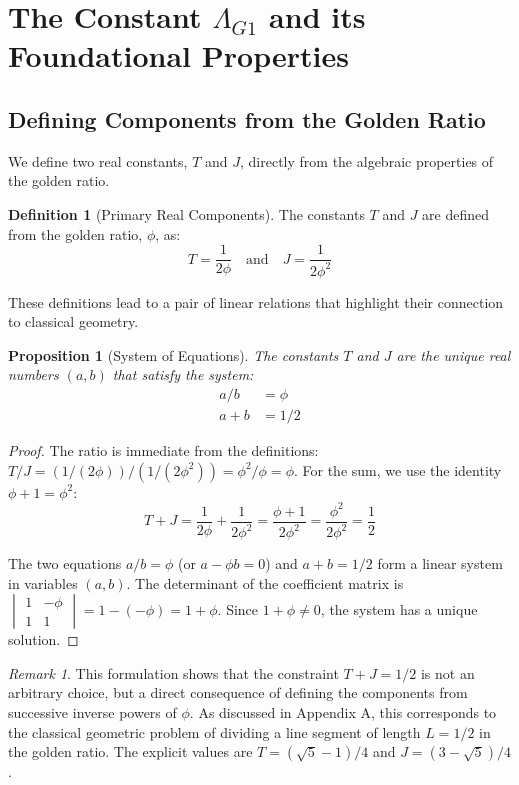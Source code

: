 \documentclass{amsart}
\theoremstyle{plain}
\newtheorem{proposition}[theorem]{Proposition}
\theoremstyle{definition}
\newtheorem{definition}[theorem]{Definition}
\theoremstyle{remark}
\newtheorem*{remark}{Remark}
\newcommand{\LambdaG}{\Lambda_{G1}}
\newcommand{\phiG}{\phi}
\begin{document}
\section{The Constant \texorpdfstring{$\LambdaG$}{Lambda\_G1} and its Foundational Properties}

\subsection{Defining Components from the Golden Ratio}
We define two real constants, $T$ and $J$, directly from the algebraic properties of the golden ratio.
\begin{definition}[Primary Real Components]
The constants $T$ and $J$ are defined from the golden ratio, $\phiG$, as:
$$ T = \frac{1}{2\phiG} \quad \text{and} \quad J = \frac{1}{2\phiG^2} $$

\end{definition}

These definitions lead to a pair of linear relations that highlight their connection to classical geometry.
\begin{proposition}[System of Equations]
The constants $T$ and $J$ are the unique real numbers $(a,b)$ that satisfy the system:
\begin{align}
    a/b &= \phiG \\
    a+b &= 1/2
\end{align}

\end{proposition}
\begin{proof}
The ratio is immediate from the definitions: $T/J = (1/(2\phiG))/(1/(2\phiG^2)) = \phiG^2/\phiG = \phiG$. For the sum, we use the identity $\phiG+1 = \phiG^2$:
$$ T+J = \frac{1}{2\phiG} + \frac{1}{2\phiG^2} = \frac{\phiG+1}{2\phiG^2} = \frac{\phiG^2}{2\phiG^2} = \frac{1}{2} $$

The two equations $a/b = \phiG$ (or $a - \phiG b = 0$) and $a+b=1/2$ form a linear system in variables $(a,b)$. The determinant of the coefficient matrix is $\begin{vmatrix} 1 & -\phiG \\ 1 & 1 \end{vmatrix} = 1 - (-\phiG) = 1+\phiG$. Since $1+\phiG \neq 0$, the system has a unique solution.
\end{proof}

\begin{remark}
This formulation shows that the constraint $T+J=1/2$ is not an arbitrary choice, but a direct consequence of defining the components from successive inverse powers of $\phiG$. As discussed in Appendix A, this corresponds to the classical geometric problem of dividing a line segment of length $L=1/2$ in the golden ratio. The explicit values are $T = (\sqrt{5}-1)/4$ and $J = (3-\sqrt{5})/4$.
\end{remark}
\end{document}

